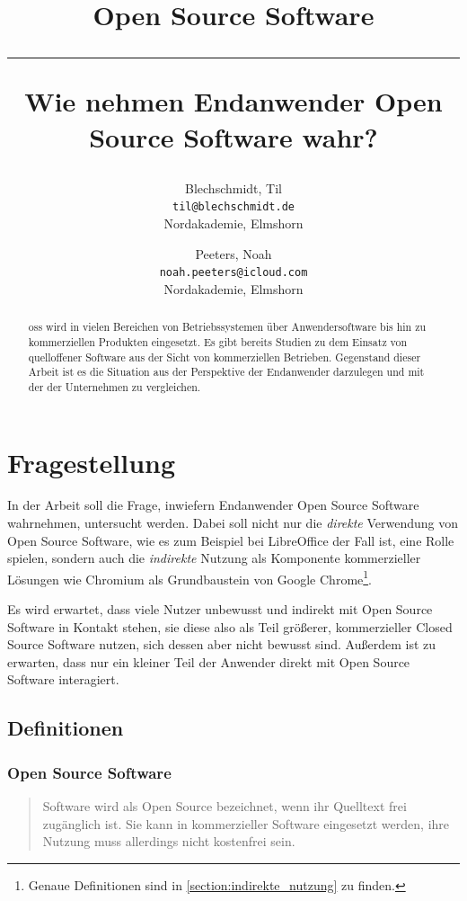 \documentclass[a4paper]{article}
\title{Open Source Software \\
    \noindent\rule[0.25ex]{\linewidth}{0.5pt}
    \large Wie nehmen Endanwender Open Source Software wahr?
}
\author{
  Blechschmidt, Til\\
  \texttt{til@blechschmidt.de}\\
  Nordakademie, Elmshorn
  \and
  Peeters, Noah\\
  \texttt{noah.peeters@icloud.com}\\
  Nordakademie, Elmshorn
}
\begin{document}
    \thispagestyle{fancy}
    \maketitle

    \clearpage
    \begin{abstract}
         \gls{oss} wird in vielen Bereichen von Betriebssystemen über Anwendersoftware bis hin zu kommerziellen Produkten eingesetzt. Es gibt bereits Studien zu dem Einsatz von quelloffener Software aus der Sicht von kommerziellen Betrieben. Gegenstand dieser Arbeit ist es die Situation aus der Perspektive der Endanwender darzulegen und mit der der Unternehmen zu vergleichen.
    \end{abstract}
    \newpage

    \tableofcontents
    \listoffigures
    \listoftables
    \clearpage

    
                    
    \section{Fragestellung}
        In der Arbeit soll die Frage, inwiefern Endanwender Open Source Software wahrnehmen, untersucht werden. Dabei soll nicht nur die \emph{direkte} Verwendung von Open Source Software, wie es zum Beispiel bei LibreOffice der Fall ist, eine Rolle spielen, sondern auch die \emph{indirekte} Nutzung als Komponente kommerzieller Lösungen wie Chromium als Grundbaustein von Google Chrome\footnote{Genaue Definitionen sind in \ref{section:indirekte_nutzung} zu finden.}.
		
		Es wird erwartet, dass viele Nutzer unbewusst und indirekt mit Open Source Software in Kontakt stehen, sie diese also als Teil größerer, kommerzieller Closed Source Software nutzen, sich dessen aber nicht bewusst sind. Außerdem ist zu erwarten, dass nur ein kleiner Teil der Anwender direkt mit Open Source Software interagiert\cite{oss:lotus-to-linux}.

		\subsection{Definitionen} %
            \subsubsection{Open Source Software}
                \begin{quote} 
                    \centering 
                    Software wird als Open Source bezeichnet, wenn ihr Quelltext frei zugänglich ist. Sie kann in kommerzieller Software eingesetzt werden, ihre Nutzung muss allerdings nicht kostenfrei sein. 
                \end{quote}
                
\end{document}
